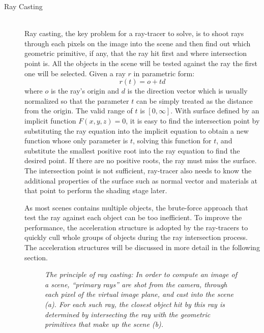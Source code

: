 \begin{description}
	\item[Ray Casting] \hfill \\
		Ray casting, the key problem for a ray-tracer to solve, is to shoot rays through each pixels on the image into the scene and then find out which geometric primitive, if any, that the ray hit first and where intersection point is. All the objects in the scene will be tested against the ray the first one will be selected. Given a ray \(r\) in parametric form:
		\begin{equation}
			r(t) = o + td
		\end{equation}
		where \( o \) is the ray's origin and \( d \) is the direction vector which is usually normalized so that the parameter \( t \) can be simply treated as the distance from the origin. The valid range of \( t \) is \( [0, \infty] \). With surface defined by an implicit function \( F(x, y, z) = 0 \), it is easy to find the intersection point by substituting the ray equation into the implicit equation to obtain a new function whose only parameter is \( t \), solving this function for \( t \), and substitute the smallest positive root into the ray equation to find the desired point. If there are no positive roots, the ray must miss the surface. The intersection point is not sufficient, ray-tracer also needs to know the additional properties of the surface such as normal vector and materials at that point to perform the shading stage later.

		As most scenes contains multiple objects, the brute-force approach that test the ray against each object can be too inefficient. To improve the performance, the acceleration structure is adopted by the ray-tracers to quickly cull whole groups of objects during the ray intersection process. The acceleration structures will be discussed in more detail in the following section.

		\begin{figure}[hpt]
			\centering
			\hspace{0.01in} 
			\renewcommand{\thefigure}{\thechapter.\arabic{figure}}
			\caption[Ray Casting]{\emph{The principle of ray casting: In order to compute an image of a scene, ``primary rays'' are shot from the camera, through each pixel of the virtual image plane, and cast into the scene (a). For each such ray, the closest object hit by this ray is determined by intersecting the ray with the geometric primitives that make up the scene (b).}} 
			\label{fig:ray_casting}	%
		\end{figure}


\end{description}
